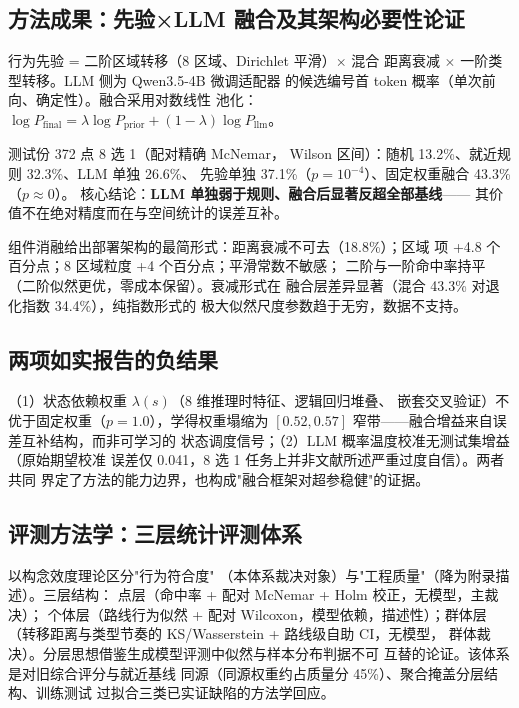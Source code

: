 \documentclass[UTF8,zihao=-4,a4paper]{ctexart}
\begin{document}
\subsection{方法成果：先验×LLM 融合及其架构必要性论证}

行为先验 = 二阶区域转移（8 区域、Dirichlet 平滑）$\times$ 混合
距离衰减 $\times$ 一阶类型转移。LLM 侧为 Qwen3.5-4B 微调适配器
的候选编号首 token 概率（单次前向、确定性）。融合采用对数线性
池化\cite{hinton2002poe}：$\log P_{\mathrm{final}} = \lambda
\log P_{\mathrm{prior}} + (1-\lambda)\log P_{\mathrm{llm}}$。

测试份 372 点 8 选 1（配对精确 McNemar\cite{mcnemar1947note}，
Wilson 区间）：随机 13.2\%、就近规则 32.3\%、LLM 单独 26.6\%、
先验单独 37.1\%（$p=10^{-4}$）、固定权重融合 43.3\%（$p\approx0$）。
核心结论：\textbf{LLM 单独弱于规则、融合后显著反超全部基线}——
其价值不在绝对精度而在与空间统计的误差互补。

组件消融给出部署架构的最简形式：距离衰减不可去（18.8\%）；区域
项 +4.8 个百分点；8 区域粒度 +4 个百分点；平滑常数不敏感；
二阶与一阶命中率持平（二阶似然更优，零成本保留）。衰减形式在
融合层差异显著（混合 43.3\% 对退化指数 34.4\%），纯指数形式的
极大似然尺度参数趋于无穷，数据不支持。

\subsection{两项如实报告的负结果}

（1）状态依赖权重 $\lambda(s)$（8 维推理时特征、逻辑回归堆叠、
嵌套交叉验证）不优于固定权重（$p=1.0$），学得权重塌缩为
$[0.52,0.57]$ 窄带——融合增益来自误差互补结构，而非可学习的
状态调度信号；（2）LLM 概率温度校准无测试集增益（原始期望校准
误差仅 0.041，8 选 1 任务上并非文献所述严重过度自信）。两者共同
界定了方法的能力边界，也构成"融合框架对超参稳健"的证据。

\subsection{评测方法学：三层统计评测体系}

以构念效度理论\cite{cronbach1955construct}区分"行为符合度"
（本体系裁决对象）与"工程质量"（降为附录描述）。三层结构：
点层（命中率 + 配对 McNemar + Holm 校正，无模型，主裁决）；
个体层（路线行为似然 + 配对 Wilcoxon，模型依赖，描述性）；群体层
（转移距离与类型节奏的 KS/Wasserstein + 路线级自助 CI，无模型，
群体裁决）。分层思想借鉴生成模型评测中似然与样本分布判据不可
互替的论证\cite{theis2016note}。该体系是对旧综合评分与就近基线
同源（同源权重约占质量分 45\%）、聚合掩盖分层结构、训练测试
过拟合三类已实证缺陷的方法学回应。
\end{document}
